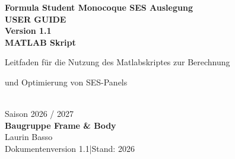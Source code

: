 \documentclass[12pt,oneside]{report}
\newcommand{\DocVersion}{1.1}
\begin{document}
  \hypersetup{pageanchor=false}

  \begin{titlepage}
    \thispagestyle{empty}
    \vspace*{0.8cm}
    \begin{center}
      {\LARGE \textbf{Formula Student Monocoque SES Auslegung}}\\[3.2cm]
    
      {\huge \textbf{USER GUIDE}}\\[0.5cm]
      {\Large \textbf{Version \DocVersion}}\\[2.2cm]
      {\Large \textbf{MATLAB Skript}}\\[2.2cm]
      {\large Leitfaden für die Nutzung des Matlabskriptes zur Berechnung \par und Optimierung von SES-Panels}\\[1.8cm]

      {\large Saison 2026 / 2027}\\[1.5cm]

      \textbf{Baugruppe Frame \& Body}\\[0.4cm]
      Laurin Basso\\[1.5cm]

      \vfill
      {\small Dokumentenversion \DocVersion \quad|\quad Stand: 2026}
    \end{center}
  \end{titlepage}
  \clearpage

  \hypersetup{pageanchor=true}
  \tableofcontents
  \clearpage

  \listoftables
  \clearpage

  
  \clearpage
\end{document}
